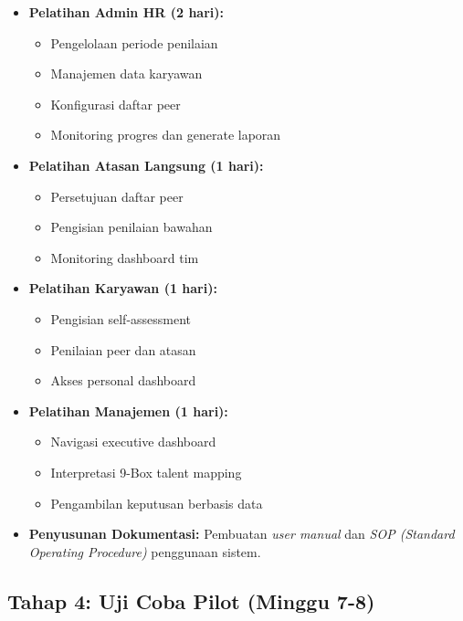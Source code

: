 \documentclass[12pt,a4paper,oneside]{report}
\begin{document}
\begin{itemize}
  \item \textbf{Pelatihan Admin HR (2 hari):} 
    \begin{itemize}
      \item Pengelolaan periode penilaian
      \item Manajemen data karyawan
      \item Konfigurasi daftar peer
      \item Monitoring progres dan generate laporan
    \end{itemize}
  \item \textbf{Pelatihan Atasan Langsung (1 hari):}
    \begin{itemize}
      \item Persetujuan daftar peer
      \item Pengisian penilaian bawahan
      \item Monitoring dashboard tim
    \end{itemize}
  \item \textbf{Pelatihan Karyawan (1 hari):}
    \begin{itemize}
      \item Pengisian self-assessment
      \item Penilaian peer dan atasan
      \item Akses personal dashboard
    \end{itemize}
  \item \textbf{Pelatihan Manajemen (1 hari):}
    \begin{itemize}
      \item Navigasi executive dashboard
      \item Interpretasi 9-Box talent mapping
      \item Pengambilan keputusan berbasis data
    \end{itemize}
  \item \textbf{Penyusunan Dokumentasi:} Pembuatan \textit{user manual} dan \textit{SOP (Standard Operating Procedure)} penggunaan sistem.
\end{itemize}

\subsection{Tahap 4: Uji Coba Pilot (Minggu 7-8)}
\end{document}
